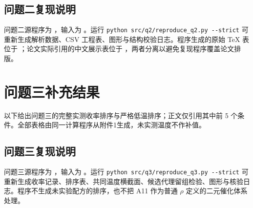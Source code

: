 \subsection{问题二复现说明}

问题二源程序为 ，输入为
。运行
\nolinkurl{python src/q2/reproduce_q2.py --strict}
可重新生成解析数据、CSV 工程表、图形与结构校验日志。程序生成的原始 TeX 表位于
；论文实际引用的中文展示表位于
，两者分离以避免复现程序覆盖论文排版。

\clearpage
\section{问题三补充结果}
\label{app:q3-results}

以下给出问题三的完整实测收率排序与严格低温排序；正文仅引用其中前 5 个条件。全部表格由同一计算程序从附件1生成，未实测温度不作补值。




\subsection{问题三复现说明}

问题三源程序为 ，输入为
。运行
\nolinkurl{python src/q3/reproduce_q3.py --strict}
可重新生成收率记录、排序表、共同温度横截面、候选代理留组检验、图形与核验日志。程序不生成未实验配方的排序，也不把 A11 作为普通 $\rho$ 定义的二元催化体系处理。

